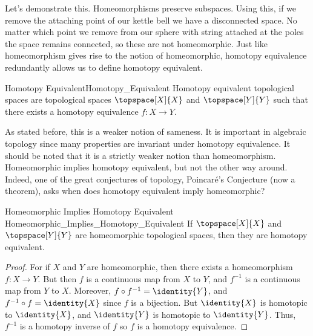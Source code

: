 \documentclass{book}                                                           %
\begin{document}
                \hfill
                \begin{minipage}{0.54\textwidth}
                    Let's demonstrate this. Homeomorphisms preserve subspaces.
                    Using this, if we remove the attaching point of our kettle
                    bell we have a disconnected space. No matter which point we
                    remove from our sphere with string attached at the poles the
                    space remains connected, so these are not homeomorphic.
                    Just like homeomorphism gives rise to the notion of
                    homeomorphic, homotopy equivalence redundantly allows us to
                    define homotopy equivalent.
                \end{minipage}
                \par\hfill\par
                \begin{fdefinition}{Homotopy Equivalent}{Homotopy_Equivalent}
                    Homotopy equivalent topological spaces are topological
                    spaces $\topspace[X]{X}$ and $\topspace[Y]{Y}$ such that
                    there exists a homotopy equivalence $f:X\rightarrow{Y}$.
                \end{fdefinition}
                As stated before, this is a weaker notion of sameness. It is
                important in algebraic topology since many properties are
                invariant under homotopy equivalence. It should be noted that it
                is a strictly weaker notion than homeomorphism. Homeomorphic
                implies homotopy equivalent, but not the other way around.
                Indeed, one of the great conjectures of topology,
                Poincar\'{e}'s Conjecture (now a theorem), asks when does
                homotopy equivalent imply homeomorphic?
                \begin{ltheorem}{Homeomorphic Implies Homotopy Equivalent}
                                {Homeomorphic_Implies_Homotopy_Equivalent}
                    If $\topspace[X]{X}$ and $\topspace[Y]{Y}$ are homeomorphic
                    topological spaces, then they are homotopy equivalent.
                \end{ltheorem}
                \begin{proof}
                    For if $X$ and $Y$ are homeomorphic, then there exists a
                    homeomorphism $f:X\rightarrow{Y}$. But then $f$ is a
                    continuous map from $X$ to $Y$, and $f^{-1}$ is a continuous
                    map from $Y$ to $X$. Moreover,
                    ${f}\circ{f^{-1}}=\identity{Y}$, and
                    ${f^{-1}}\circ{f}=\identity{X}$ since $f$ is a bijection.
                    But $\identity{X}$ is homotopic to $\identity{X}$, and
                    $\identity{Y}$ is homotopic to $\identity{Y}$. Thus,
                    $f^{\minus{1}}$ is a homotopy inverse of $f$ so $f$ is a
                    homotopy equivalence.
                \end{proof}
\end{document}
